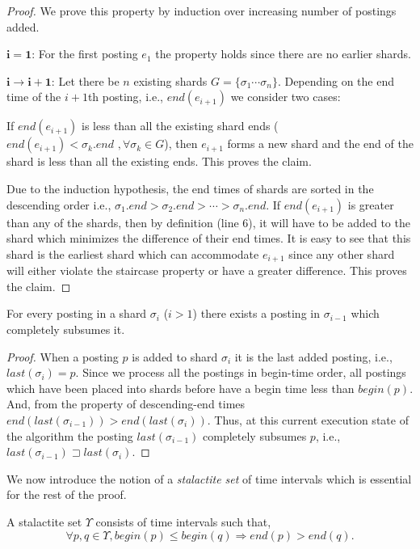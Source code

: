 \begin{proof}{} We prove this property by induction over increasing number of postings added. 

$\mathbf{i = 1}$: For the first posting $e_1$ the property holds since there are no earlier shards. 

$\mathbf{i \rightarrow i+1}$: Let there be $n$ existing shards $G = \{ \sigma_1 \cdots \sigma_n \}$. Depending on the end time of the $i+1$th posting, i.e., $end(e_{i+1})$ we consider two cases:

If $end(e_{i+1})$ is less than all the existing shard ends  ($end(e_{i+1}) < \sigma_k.end \,\, ,\forall \sigma_k \in G$), then $e_{i+1}$ forms a new shard and the end of the shard is less than all the existing ends. This proves the claim.

Due to the induction hypothesis, the end times of shards are sorted in the descending order i.e., $\sigma_1.end > \sigma_2.end > \cdots > \sigma_n.end$. If $end(e_{i+1})$ is greater than any of the shards, then by definition (line 6), it will have to be added to the shard which minimizes the difference of their end times. It is easy to see that this shard is the earliest shard which can accommodate $e_{i+1}$ since any other shard will either violate the staircase property or have a greater difference. This proves the claim. 
\end{proof}


\begin{lemma}
\label{lemma:subsumption}
For every posting in a shard $\sigma_i$ ($i > 1$) there exists a posting in $\sigma_{i-1}$ which completely subsumes it.
\end{lemma}
\begin{proof}{} When a posting $p$ is added to shard $\sigma_i$ it is the last added posting, i.e., $last(\sigma_i) = p$. Since we process all the postings in begin-time order, all postings which have been placed into shards before have a begin time less than $begin(p)$. And, from the property of descending-end times $end(last(\sigma_{i-1})) > end(last(\sigma_{i}))$. Thus, at this current execution state of the algorithm the posting $last(\sigma_{i-1})$ completely subsumes $p$, i.e., $last(\sigma_{i-1}) \sqsupset last(\sigma_{i}) $.  
\end{proof}


We now introduce the notion of a \emph{stalactite set} of time intervals which is essential for the rest of the proof. 

\begin{definition}
	\label{def:stalactite}
	A stalactite set $\Upsilon$ consists of time intervals such that,
	$$\forall p, q \in \Upsilon, begin(p) \leq begin(q) \Rightarrow end(p) > end (q) .$$
\end{definition}

